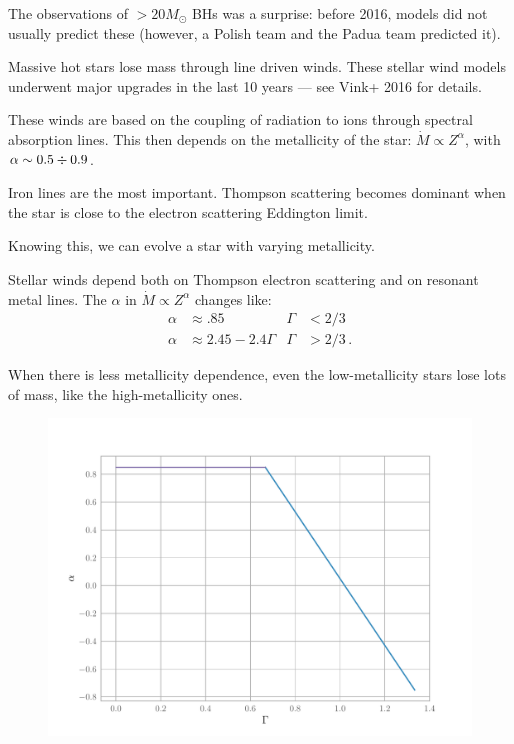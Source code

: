 \documentclass[main.tex]{subfiles}
\begin{document}
The observations of \(> 20 M_{\odot}\) BHs was a surprise: before 2016, models did not usually predict these (however, a Polish team and the Padua team predicted it).

Massive hot stars lose mass through line driven winds. 
These stellar wind models underwent major upgrades in the last 10 years --- see Vink+ 2016 for details. 

These winds are based on the coupling of radiation to ions through spectral absorption lines. This then depends on the metallicity of the star: \(\dot{M} \propto Z^{\alpha }\), with \(\alpha \sim \num{.5} \divisionsymbol \num{.9}\). 

Iron lines are the most important.
Thompson scattering becomes dominant when the star is close to the electron scattering Eddington limit. 

Knowing this, we can evolve a star with varying metallicity. 

Stellar winds depend both on Thompson electron scattering and on resonant metal lines. 
The \(\alpha \) in \(\dot{M} \propto Z^{\alpha }\) changes like: 
%
\begin{subequations}
\begin{align}
\alpha &\approx \num{.85} & \Gamma &< 2/3  \\
\alpha &\approx 2.45 - 2.4\Gamma & \Gamma &>2/3
\,.
\end{align}
\end{subequations}

When there is less metallicity dependence, even the low-metallicity stars lose lots of mass, like the high-metallicity ones. 

\begin{figure}[ht]
\centering
\includegraphics[width=\textwidth]{figures/Eddington_alpha_dependence.pdf}
\caption{}
\label{fig:Eddington_alpha_dependence}
\end{figure}
  
\end{document}
